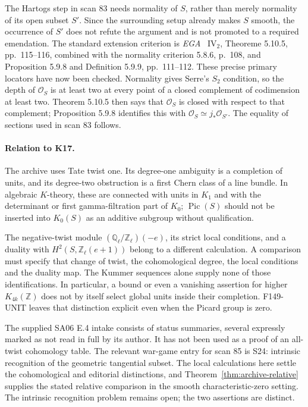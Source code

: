 \documentclass[11pt,a4paper]{article}
\theoremstyle{definition}
\begin{document}
The Hartogs step in scan 83 needs normality of \(S\), rather than
merely normality of its open subset \(S'\).  Since the surrounding
setup already makes \(S\) smooth, the occurrence of \(S'\) does not
refute the argument and is not promoted to a required emendation.
The standard extension criterion is \emph{EGA}~\cite{EGAIV2}
\(\mathrm{IV}_2\), Theoreme 5.10.5, pp.~115--116, combined with
the normality criterion 5.8.6, p.~108, and Proposition 5.9.8 and
Definition 5.9.9, pp.~111--112.  These precise primary locators have
now been checked.  Normality gives Serre's \(S_2\) condition, so
the depth of \(\mathcal O_S\) is at least two at every point of a
closed complement of codimension at least two.  Theorem 5.10.5
then says that \(\mathcal O_S\) is closed with respect to that
complement; Proposition 5.9.8 identifies this with
\(\mathcal O_S\simeq j_*\mathcal O_{S'}\).
The equality of sections used in scan 83 follows.

\paragraph{Relation to K17.}
The archive uses Tate twist one.  Its degree-one ambiguity is a
completion of units, and its degree-two obstruction is a first Chern
class of a line bundle.  In algebraic \(K\)-theory, these are connected
with units in \(K_1\) and with the determinant or first
gamma-filtration part of \(K_0\); \(\operatorname{Pic}(S)\) should
not be inserted into \(K_0(S)\) as an additive subgroup without
qualification.

The negative-twist module
\((\mathbb Q_\ell/\mathbb Z_\ell)(-e)\), its strict local conditions,
and a duality with \(H^2(S,\mathbb Z_\ell(e+1))\) belong to a
different calculation.  A comparison must specify that change of
twist, the cohomological degree, the local conditions and the duality
map.  The Kummer sequences alone supply none of those identifications.
In particular, a bound or even a vanishing assertion for higher
\(K_{4k}(\mathbb Z)\) does not by itself select global units inside
their completion.  F149-UNIT leaves that distinction explicit even
when the Picard group is zero.

The supplied SA06 E.4 intake consists of status summaries, several
expressly marked as not read in full by its author.  It has not been
used as a proof of an all-twist cohomology table.  The relevant
war-game entry for scan 85 is S24: intrinsic recognition of the
geometric tangential subset.  The local calculations here settle the
cohomological and editorial distinctions, and Theorem~\ref{thm:archive-relative} supplies the stated relative comparison in the smooth characteristic-zero setting. The intrinsic recognition problem remains open; the two assertions are distinct.
\end{document}

